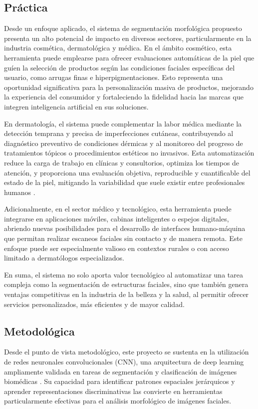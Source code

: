 \subsection{Práctica}
Desde un enfoque aplicado, el sistema de segmentación morfológica propuesto presenta un alto potencial de impacto en diversos sectores, particularmente en la industria cosmética, dermatológica y médica. En el ámbito cosmético, esta herramienta puede emplearse para ofrecer evaluaciones automáticas de la piel que guíen la selección de productos según las condiciones faciales específicas del usuario, como arrugas finas e hiperpigmentaciones. Esto representa una oportunidad significativa para la personalización masiva de productos, mejorando la experiencia del consumidor y fortaleciendo la fidelidad hacia las marcas que integren inteligencia artificial en sus soluciones.

En dermatología, el sistema puede complementar la labor médica mediante la detección temprana y precisa de imperfecciones cutáneas, contribuyendo al diagnóstico preventivo de condiciones dérmicas y al monitoreo del progreso de tratamientos tópicos o procedimientos estéticos no invasivos. Esta automatización reduce la carga de trabajo en clínicas y consultorios, optimiza los tiempos de atención, y proporciona una evaluación objetiva, reproducible y cuantificable del estado de la piel, mitigando la variabilidad que suele existir entre profesionales humanos \parencite{huang2020}.

Adicionalmente, en el sector médico y tecnológico, esta herramienta puede integrarse en aplicaciones móviles, cabinas inteligentes o espejos digitales, abriendo nuevas posibilidades para el desarrollo de interfaces humano-máquina que permitan realizar escaneos faciales sin contacto y de manera remota. Este enfoque puede ser especialmente valioso en contextos rurales o con acceso limitado a dermatólogos especializados.

En suma, el sistema no solo aporta valor tecnológico al automatizar una tarea compleja como la segmentación de estructuras faciales, sino que también genera ventajas competitivas en la industria de la belleza y la salud, al permitir ofrecer servicios personalizados, más eficientes y de mayor calidad.

\subsection{Metodológica}

Desde el punto de vista metodológico, este proyecto se sustenta en la utilización de redes neuronales convolucionales (CNN), una arquitectura de deep learning ampliamente validada en tareas de segmentación y clasificación de imágenes biomédicas \parencite{ronneberger2015}. Su capacidad para identificar patrones espaciales jerárquicos y aprender representaciones discriminativas las convierte en herramientas particularmente efectivas para el análisis morfológico de imágenes faciales.


